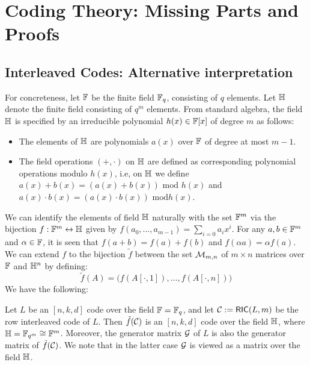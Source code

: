 \appendix


\section{Coding Theory: Missing Parts and Proofs}
\subsection{Interleaved Codes: Alternative interpretation} \label{app:AltILC}
For concreteness, let $\mathbb{F}$ be the finite field $\mathbb{F}_q$, consisting of $q$
elements. Let $\mathbb{H}$ denote the finite field consisting of $q^m$ elements. From
standard algebra, the field $\mathbb{H}$ is specified by an irreducible polynomial $h(x)\in \mathbb{F}[x]$ of
degree $m$ as follows:
\begin{itemize}
\item The elements of $\mathbb{H}$ are polynomials $a(x)$ over $\mathbb{F}$ of degree at most
$m-1$.
\item The field operations $(+,\cdot)$ on $\mathbb{H}$ are defined as corresponding
polynomial operations modulo $h(x)$, i.e, on $\mathbb{H}$ we define $a(x)+b(x) =
(a(x)+b(x)) \text{ mod } h(x)$ and $a(x)\cdot b(x) = (a(x)\cdot b(x)) \text{ mod
} h(x)$. 
\end{itemize}
We can identify the elements of field $\mathbb{H}$ naturally with the set $\mathbb{F}^m$ via
the bijection $f:\mathbb{F}^m\leftrightarrow \mathbb{H}$ given by
$f(a_0,\ldots,a_{m-1})=\sum_{i=0}a_ix^i$. For any $a,b\in \mathbb{F}^m$ and $\alpha\in
\mathbb{F}$, it is seen that $f(a+b)=f(a)+f(b)$ and $f(\alpha a)=\alpha f(a)$. We can
extend $f$ to the bijection $\tilde{f}$ between the set $\mathcal{M}_{m,n}$ of $m\times n$
matrices over $\mathbb{F}$ and $\mathbb{H}^n$ by defining:
\begin{equation}\label{lem:bijection}
\tilde{f}(A) = \big(f(A[\cdot,1]),\ldots,f(A[\cdot,n])\big)
\end{equation}
We have the following:
\begin{lemma}\label{lem:correspondence}
Let $L$ be an $[n,k,d]$ code over the field $\mathbb{F}=\mathbb{F}_q$, and let $\mathcal{C} :=
\mathsf{RIC}(L,m)$ be the row interleaved code of $L$. Then $\tilde{f}(\mathcal{C})$ is an
$[n,k,d]$ code over the field $\mathbb{H}$, where $\mathbb{H}=\mathbb{F}_{q^m}\cong \mathbb{F}^m$. Moreover,
the generator matrix $\mathcal{G}$ of $L$ is also the generator matrix of
$\tilde{f}(\mathcal{C})$. We note that in the latter case $\mathcal{G}$ is viewed as a
matrix over the field $\mathbb{H}$.
\end{lemma}
